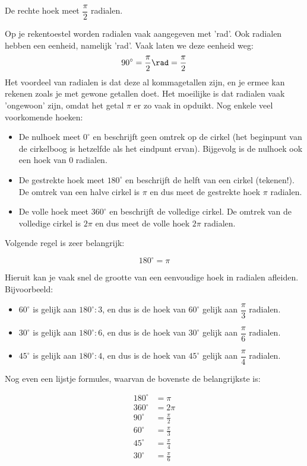 \documentclass[a4paper,12pt]{article}
\begin{document}
\begin{framed}
De rechte hoek meet $\dfrac{\pi}{2}$ radialen.
\end{framed}

Op je rekentoestel worden radialen vaak aangegeven met 'rad'. Ook radialen hebben een eenheid, namelijk 'rad'. Vaak laten we deze eenheid weg:
\[90^\circ = \frac{\pi}{2} \rad=\frac{\pi}{2}\]
Het voordeel van radialen is dat deze al kommagetallen zijn, en je ermee kan rekenen zoals je met gewone getallen doet. Het moeilijke is dat radialen vaak 'ongewoon' zijn, omdat het getal $\pi$ er zo vaak in opduikt.  Nog enkele veel voorkomende hoeken:
\begin{itemize}
	\item De nulhoek meet $0^\circ$ en beschrijft geen omtrek op de cirkel (het beginpunt van de cirkelboog is hetzelfde als het eindpunt ervan). Bijgevolg is de nulhoek ook een hoek van $0$ radialen.
	\item De gestrekte hoek meet $180^\circ$ en beschrijft de helft van een cirkel (tekenen!). De omtrek van een halve cirkel is $\pi$ en dus meet de gestrekte hoek $\pi$ radialen.
	\item De volle hoek meet $360^\circ$ en beschrijft de volledige cirkel. De omtrek van de volledige cirkel is $2\pi$ en dus meet de volle hoek $2\pi$ radialen.
\end{itemize}

Volgende regel is zeer belangrijk:
\begin{framed}
\[180^\circ=\pi\]
\end{framed}

Hieruit kan je vaak snel de grootte van een eenvoudige hoek in radialen afleiden. Bijvoorbeeld:
\begin{itemize}
	\item $60^\circ$ is gelijk aan $180^\circ:3$, en dus is de hoek van $60^\circ$ gelijk aan $\dfrac{\pi}{3}$ radialen.
	\item $30^\circ$ is gelijk aan $180^\circ:6$, en dus is de hoek van $30^\circ$ gelijk aan $\dfrac{\pi}{6}$ radialen.
	\item $45^\circ$ is gelijk aan $180^\circ:4$, en dus is de hoek van $45^\circ$ gelijk aan $\dfrac{\pi}{4}$ radialen.
\end{itemize}

Nog even een lijstje formules, waarvan de bovenste de belangrijkste is:

\begin{framed}
\begin{align*}
180^\circ&=\pi\\
360^\circ&=2\pi\\
90^\circ&=\frac{\pi}{2}\\
60^\circ&=\frac{\pi}{3}\\
45^\circ&=\frac{\pi}{4}\\
30^\circ&=\frac{\pi}{6}
\end{align*}
\end{framed}
\end{document}
